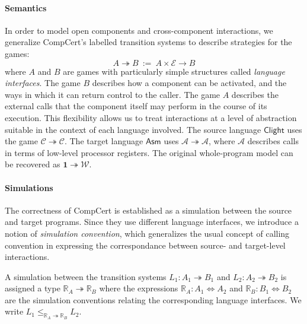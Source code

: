 \documentclass[sigplan,10pt,review,anonymous]{acmart}\settopmatter{printfolios=true,printccs=false,printacmref=false}
\newcommand{\kw}[1]{\ensuremath{ \mathsf{#1} }}
\begin{document}
\paragraph{Semantics} %

In order to model open components and cross-component interactions,
we generalize CompCert's labelled transition systems
to describe strategies for the games:
\[ A \twoheadrightarrow B \: := \:
   A \times \mathcal{E} \rightarrow B \]
where $A$ and $B$ are games with particularly simple structures
called \emph{language interfaces}.
The game $B$ describes how a component can be activated,
and the ways in which it can return control to the caller.
The game $A$ describes the external calls that the component itself
may perform in the course of its execution.
This flexibility allows us to treat interactions
at a level of abstraction suitable in the context of each language involved.
The source language \kw{Clight} uses the game
$\mathcal{C} \twoheadrightarrow \mathcal{C}$.
The target language \kw{Asm} uses
$\mathcal{A} \twoheadrightarrow \mathcal{A}$,
where $\mathcal{A}$ describes calls
in terms of low-level processor registers.
The original whole-program model can be recovered as
$\mathbf{1} \twoheadrightarrow \mathcal{W}$.



\paragraph{Simulations} %

The correctness of CompCert is established as
a simulation between the source and target programs.
Since they use different language interfaces,
we introduce a notion of \emph{simulation convention},
which generalizes the usual concept of calling convention
in expressing the correspondance between
source- and target-level interactions.

A simulation between the transition systems
$L_1 : A_1 \twoheadrightarrow B_1$ and
$L_2 : A_2 \twoheadrightarrow B_2$
is assigned a type $\mathbb{R}_A \twoheadrightarrow \mathbb{R}_B$
where the expressions
$\mathbb{R}_A : A_1 \Leftrightarrow A_2$ and
$\mathbb{R}_B : B_1 \Leftrightarrow B_2$
are the simulation conventions
relating the corresponding language interfaces.
We write
$L_1 \le_{\mathbb{R}_A \twoheadrightarrow \mathbb{R}_B} L_2$.
\end{document}
